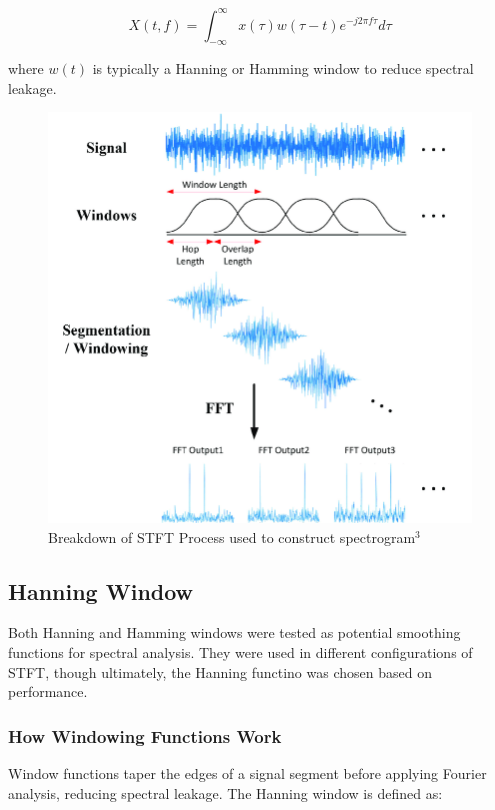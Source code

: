 \documentclass{article}
\begin{document}
\begin{equation}
X(t, f) = \int_{-\infty}^{\infty} x(\tau) w(\tau - t) e^{-j 2\pi f \tau} d\tau
\end{equation}

where $w(t)$ is typically a Hanning or Hamming window to reduce spectral leakage.

\begin{figure}[h]
\includegraphics[width=125mm,scale=0.5]{docs/LiteratureReview/images/STFT.png}
\caption{Breakdown of STFT Process used to construct spectrogram$^3$}
\end{figure}

\newpage

\subsection{Hanning Window}
Both Hanning and Hamming windows were tested as potential smoothing functions for spectral analysis. They were used in different configurations of STFT, though ultimately, the Hanning functino was chosen based on performance.

\subsubsection{How Windowing Functions Work}
Window functions taper the edges of a signal segment before applying Fourier analysis, reducing spectral leakage. The Hanning window is defined as:
\end{document}
